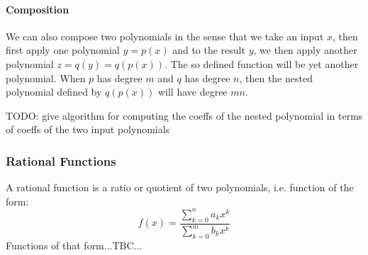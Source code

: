 
\paragraph{Composition}
We can also compose two polynomials in the sense that we take an input $x$, then first apply one polynomial $y = p(x)$ and to the result $y$, we then apply another polynomial $z = q(y) = q(p(x))$. The so defined function will be yet another polynomial. When $p$ has degree $m$ and $q$ has degree $n$, then the nested polynomial defined by $q(p(x))$ will have degree $m n$.

TODO: give algorithm for computing the coeffs of the nested polynomial in terms of coeffs of the two input polynomials






\subsubsection{Rational Functions}
A rational function is a ratio or quotient of two polynomials, i.e. function of the form:
\begin{equation}
 f(x) = \frac{\sum_{k=0}^n a_k x^k}{\sum_{k=0}^m b_k x^k}
\end{equation}
Functions of that form...TBC...

